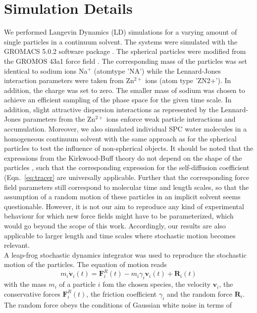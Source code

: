 \documentclass[aip,jcp,reprint]{revtex4-1}
\begin{document}
\section{Simulation Details}
We performed  Langevin Dynamics (LD) simulations for a varying amount of single particles in a continuum solvent. The systems were simulated with  the GROMACS 5.0.2 software package \cite{vanderspoel05a,gromacs08a,pronk13a}.
The spherical particles were modified from  the GROMOS 43a1 force field \cite{gunsteren96a}. The corresponding mass of the particles was set identical to sodium ions Na$^+$ (atomtype 'NA') while the Lennard-Jones interaction parameters were taken from Zn$^{2+}$ ions (atom type 'ZN2+'). In addition, the charge was set to zero. The smaller mass of sodium was chosen to achieve an efficient sampling of the phase space for the given time scale. In addition, slight attractive dispersion interactions as represented by the Lennard-Jones parameters from the Zn$^{2+}$ ions enforce weak particle interactions and accumulation. 
Moreover, we also simulated individual SPC water molecules \cite{berendsen81a} in a homogeneous continuum solvent with the same approach as for the spherical particles to test the influence of non-spherical objects. It should be noted that the expressions from the Kirkwood-Buff theory do not depend on the shape of the particles \cite{ben13a,smiatek17a,smith06,pierce08a}, such that the corresponding expression for the self-diffusion coefficient (Eqn.~\eqref{eq:tracer} are universally applicable.
Further that the corresponding force field parameters still correspond to molecular time and length scales, so that the assumption of a random motion of these particles in an implicit solvent seems questionable. However, it is not our aim to reproduce any kind of experimental behaviour for which new force fields might have to be parameterized, which would go beyond the scope of this work. Accordingly, our results are also applicable to larger length and time scales where stochastic motion becomes relevant.\\
A leap-frog stochastic dynamics integrator \cite{vangunsteren88a} was used to reproduce the stochastic motion of the particles. The equation of motion reads 
\begin{equation}
\label{eq:LD}
m_i\dot{\textbf{v}}_i(t) = {\textbf{F}}_i^R(t)-m_i\gamma_i{\textbf{v}}_i(t)+{\textbf{R}}_i(t)
\end{equation}
with the mass $m_i$ of a particle $i$ fom the chosen species, the velocity $\textbf{v}_i$, the conservative forces $ {\textbf{F}}_i^R(t)$, the friction coefficient $\gamma_i$ and the random force ${\textbf{R}}_i$. The random force obeys the conditions of Gaussian white noise in terms of 
\end{document}
